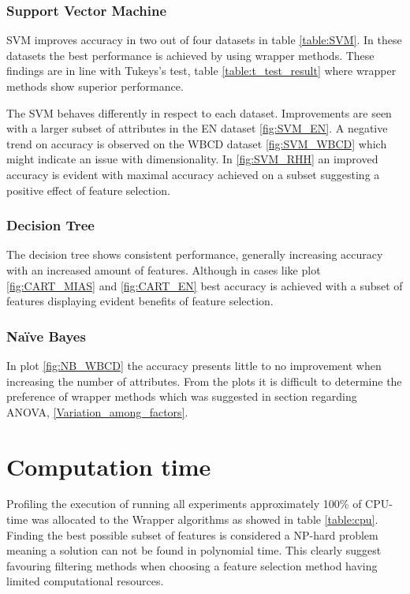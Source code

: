 \subsubsection{Support Vector Machine}

SVM improves accuracy in two out of four datasets in table \ref{table:SVM}. In these datasets the best performance is achieved by using wrapper methods. These findings are in line with Tukeys's test, table \ref{table:t_test_result} where wrapper methods show superior performance.

The SVM behaves differently in respect to each dataset. Improvements are seen with a larger subset of attributes in the EN dataset \ref{fig:SVM_EN}. A negative trend on accuracy is observed on the WBCD dataset \ref{fig:SVM_WBCD} which might indicate an issue with dimensionality. In \ref{fig:SVM_RHH} an improved accuracy is evident with maximal accuracy achieved on a subset suggesting a positive effect of feature selection.

\subsubsection{Decision Tree}

The decision tree shows consistent performance, generally increasing accuracy with an increased amount of features. Although in cases like plot \ref{fig:CART_MIAS} and \ref{fig:CART_EN} best accuracy is achieved with a subset of features displaying evident benefits of feature selection.

\subsubsection{Naïve Bayes}

In plot \ref{fig:NB_WBCD} the accuracy presents little to no improvement when increasing the number of attributes. From the plots it is difficult to determine the preference of wrapper methods which was suggested in section regarding ANOVA, \ref{Variation_among_factors}.






\newpage
\section{Computation time}
\label{sec:cumtime}

Profiling the execution of running all experiments approximately 100\% of CPU-time was allocated to the Wrapper algorithms as showed in table \ref{table:cpu}. Finding the best possible subset of features is considered a NP-hard problem meaning a solution can not be found in polynomial time. This clearly suggest favouring filtering methods when choosing a feature selection method having limited computational resources.

